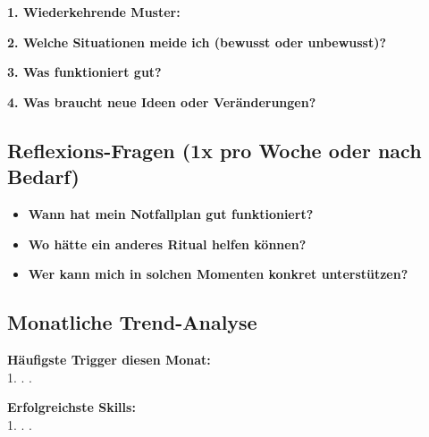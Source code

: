 \begin{tcolorbox}[colback=ctmmPurple!5!white,colframe=ctmmPurple,title=\textcolor{white}{\textbf{Reflexionsfragen für diese Woche}}]

\textbf{1. Wiederkehrende Muster:}\\

\textbf{2. Welche Situationen meide ich (bewusst oder unbewusst)?}\\

\textbf{3. Was funktioniert gut?}\\

\textbf{4. Was braucht neue Ideen oder Veränderungen?}\\

\end{tcolorbox}

\subsection*{\textcolor{ctmmGreen}{Reflexions-Fragen (1x pro Woche oder nach Bedarf)}}

\begin{itemize}
  \item \textbf{Wann hat mein Notfallplan gut funktioniert?}\\

  \item \textbf{Wo hätte ein anderes Ritual helfen können?}\\

  \item \textbf{Wer kann mich in solchen Momenten konkret unterstützen?}\\
\end{itemize}

\subsection*{\textcolor{ctmmOrange}{Monatliche Trend-Analyse}}

\textbf{Häufigste Trigger diesen Monat:}\\
1.  .  . 

\textbf{Erfolgreichste Skills:}\\
1.  .  . 

